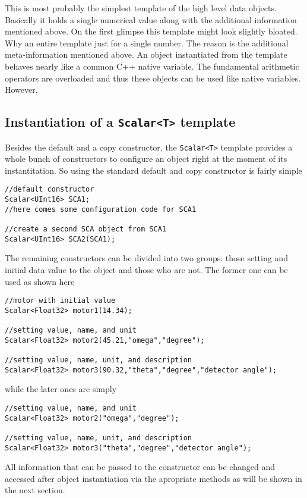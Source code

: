 This is most probably the simplest template of the high level data objects. 
Basically it holds a single numerical value along with the additional 
information mentioned above. 
On the first glimpse this template might look slightly bloated. Why an 
entire template just for a single number. The reason is the additional
meta-information mentioned above. An object instantiated from the template 
behaves nearly like a common C++ native variable. The fundamental 
arithmetic operators are overloaded and thus these objects can be used 
like native variables. 
However, 

\subsection{Instantiation of a {\tt Scalar<T>} template}

Besides the default and a copy constructor, the {\tt Scalar<T>} template 
provides a whole bunch of constructors to configure an object right at the 
moment of its instantitation.
So using the standard default and copy constructor is fairly simple
\begin{verbatim}
//default constructor
Scalar<UInt16> SCA1;
//here comes some configuration code for SCA1

//create a second SCA object from SCA1
Scalar<UInt16> SCA2(SCA1);
\end{verbatim} 
The remaining constructors can be divided into two groups: those setting 
and initial data value to the object and those who are not. 
The former one can be used as shown here
\begin{verbatim}
//motor with initial value
Scalar<Float32> motor1(14.34);

//setting value, name, and unit
Scalar<Float32> motor2(45.21,"omega","degree");

//setting value, name, unit, and description
Scalar<Float32> motor3(90.32,"theta","degree","detector angle");
\end{verbatim}
while the later ones are simply
\begin{verbatim}
//setting value, name, and unit
Scalar<Float32> motor2("omega","degree");

//setting value, name, unit, and description
Scalar<Float32> motor3("theta","degree","detector angle");
\end{verbatim}
All information that can be passed to the constructor can be changed 
and accessed after object instantiation via the apropriate methods as 
will be shown in the next section.

